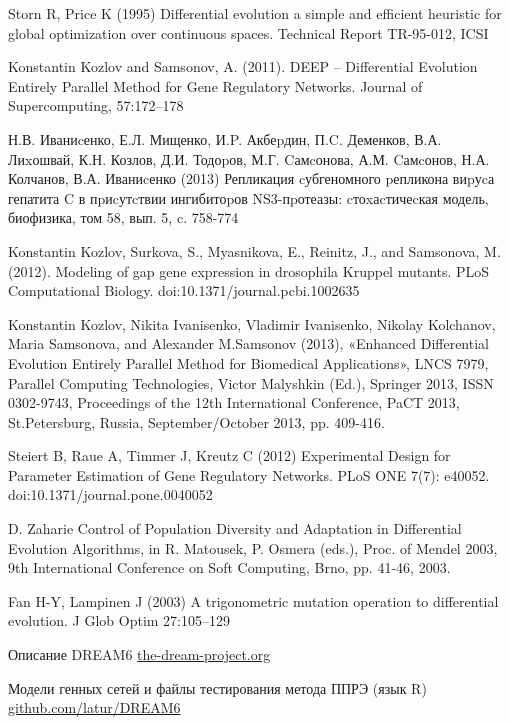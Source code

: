 
\begin{thebibliography}{20} %

	Storn R, Price K (1995) 
	Differential evolution a simple and efficient heuristic for global optimization over continuous spaces. Technical Report TR-95-012, ICSI
	
	Konstantin Kozlov and Samsonov, A. (2011). 
	DEEP – Differential Evolution Entirely Parallel Method for Gene Regulatory Networks. Journal of Supercomputing, 57:172–178
	
	Н.В. Иваниcенко, Е.Л. Мищенко, И.P. Акбеpдин, П.C. Деменков, В.А. Лиxошвай, К.Н. Козлов, Д.И. Тодоpов, М.Г. Cамcонова, А.М. Cамcонов, Н.А. Колчанов, В.А. Иваниcенко (2013) 
	Репликация cубгеномного pепликона виpуcа гепатита C в пpиcутcтвии ингибитоpов NS3-пpотеазы: cтоxаcтичеcкая модель, биофизика, том 58, вып. 5, c. 758-774

	Konstantin Kozlov, Surkova, S., Myasnikova, E., Reinitz, J., and Samsonova, M. (2012). 
	Modeling of gap gene expression in drosophila Kruppel mutants. PLoS Computational Biology. doi:10.1371/journal.pcbi.1002635

	Konstantin Kozlov, Nikita Ivanisenko, Vladimir Ivanisenko, Nikolay Kolchanov, Maria Samsonova, and Alexander M.Samsonov (2013), 
	«Enhanced Differential Evolution Entirely Parallel Method for Biomedical Applications», LNCS 7979, Parallel Computing Technologies, Victor Malyshkin (Ed.), 
	Springer 2013, ISSN 0302-9743, Proceedings of the 12th International Conference, PaCT 2013, St.Petersburg, Russia, September/October 2013, pp. 409-416.

	Steiert B, Raue A, Timmer J, Kreutz C (2012) 
	Experimental Design for Parameter Estimation of Gene Regulatory Networks. PLoS ONE 7(7): e40052. doi:10.1371/journal.pone.0040052
	
	D. Zaharie
	Control of Population Diversity and Adaptation in Differential Evolution Algorithms, 
	in R. Matousek, P. Osmera (eds.), Proc. of Mendel 2003, 9th International Conference on Soft Computing, Brno, pp. 41-46, 2003.
	
	Fan H-Y, Lampinen J (2003) 
	A trigonometric mutation operation to differential evolution. J Glob Optim 27:105–129
	
	Описание DREAM6 \href{http://www.the-dream-project.org/challenges/dream6-estimation-model-parameters-challenge}{the-dream-project.org}

	Модели генных сетей и файлы тестирования метода ППРЭ (язык R) \href{https://github.com/latur/DREAM6}{github.com/latur/DREAM6}

\end{thebibliography}
